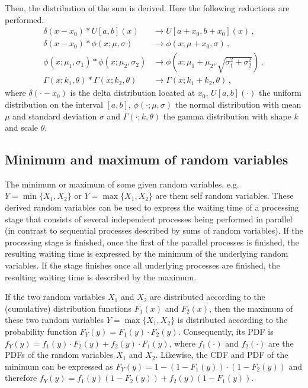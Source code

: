 \documentclass[a4paper, 10pt]{paper}
\begin{document}
Then, the distribution of the sum is derived. Here the following reductions are performed.
\begin{align}
 \delta(x-x_0)\ast U[a,b](x) &\longrightarrow U[a+x_0,b+x_0](x)\,, \nonumber \\
 \delta(x-x_0)\ast \phi(x; \mu, \sigma) &\longrightarrow \phi(x; \mu+x_0, \sigma)\,, \nonumber \\
 \phi(x; \mu_1, \sigma_1)\ast \phi(x; \mu_2, \sigma_2) &\longrightarrow 
   \phi(x; \mu_1+\mu_2, \sqrt{\sigma_1^2+\sigma_2^2}) \nonumber\,, \\
 \Gamma(x; k_1, \theta)\ast \Gamma(x; k_2, \theta) &\longrightarrow 
   \Gamma(x; k_1+k_2, \theta)\,, \nonumber
\end{align}
where $\delta(\cdot-x_0)$ is the delta distribution located at $x_0$, $U[a,b](\cdot)$ the uniform
distribution on the interval $[a,b]$, $\phi(\cdot; \mu, \sigma)$ the normal distribution with mean 
$\mu$ and standard deviation $\sigma$ and $\Gamma(\cdot; k, \theta)$ the gamma distribution with
shape $k$ and scale $\theta$.

\subsection{Minimum and maximum of random variables}
The minimum or maximum of some given random variables, e.g. $Y=\min\{X_1,X_2\}$ or 
$Y=\max\{X_1,X_2\}$ are them self random variables. These derived random variables can be used to
express the waiting time of a processing stage that consists of several independent processes being
performed in parallel (in contrast to sequential processes described by sums of random variables). 
If the processing stage is finished, once the first of the parallel processes is finished, the 
resulting waiting time is expressed by the minimum of the underlying random variables. If the stage
finishes once all underlying processes are finished, the resulting waiting time is described
by the maximum. 

If the two random variables $X_1$ and $X_2$ are distributed according to the (cumulative) distribution
functions $F_1(x)$ and $F_2(x)$, then the maximum of these two random variables $Y=\max\{X_1,X_2\}$
is distributed according to the probability function $F_Y(y)=F_1(y)\cdot F_2(y)$. Consequently, its PDF
is $f_Y(y)=f_1(y)\cdot F_2(y) + f_2(y)\cdot F_1(y)$, where $f_1(\cdot)$ and $f_2(\cdot)$ are the PDFs
of the random variables $X_1$ and $X_2$. Likewise, the CDF and PDF of the minimum can be expressed as
$F_Y(y)=1-(1-F_1(y))\cdot(1-F_2(y))$ and therefore $f_Y(y) = f_1(y)(1-F_2(y)) + f_2(y)(1-F_1(y))$.
\end{document}
